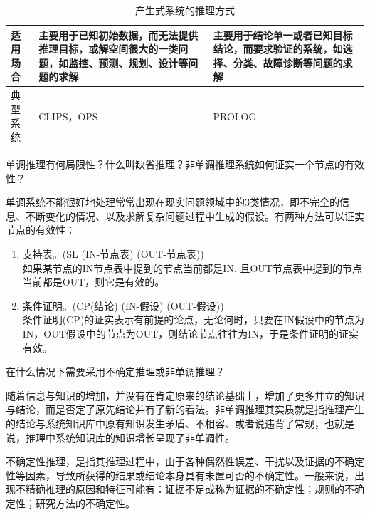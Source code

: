 \begin{solution}
\begin{table}[htbp]
\begin{tabular}{p{80pt}p{110pt}p{110pt}}
		\midrule
		适用场合 & 主要用于已知初始数据，而无法提供推理目标，或解空间很大的一类问题，如监控、预测、规划、设计等问题的求解 & 主要用于结论单一或者已知目标结论，而要求验证的系统，如选择、分类、故障诊断等问题的求解 \\ 
		\midrule
		典型系统 & CLIPS，OPS & PROLOG \\
		\bottomrule
	\end{tabular}
	\caption{产生式系统的推理方式}\label{tab:reasoning-of-production-system}
	\end{table}
\end{solution}

\begin{question}
单调推理有何局限性？什么叫缺省推理？非单调推理系统如何证实一个节点的有效性？
\end{question}
\begin{solution}
单调系统不能很好地处理常常出现在现实问题领域中的3类情况，即不完全的信息、不断变化的情况、以及求解复杂问题过程中生成的假设。有两种方法可以证实节点的有效性：
	\begin{enumerate}
		\item 支持表。(SL (IN-节点表) (OUT-节点表)) \\
			如果某节点的IN节点表中提到的节点当前都是IN, 且OUT节点表中提到的节点当前都是OUT，则它是有效的。
		\item 条件证明。(CP(结论) (IN-假设) (OUT-假设)) \\
			条件证明(CP)的证实表示有前提的论点，无论何时，只要在IN假设中的节点为IN，OUT假设中的节点为OUT，则结论节点往往为IN，于是条件证明的证实有效。 
	\end{enumerate}
\end{solution}

\begin{question}
在什么情况下需要采用不确定推理或非单调推理？
\end{question}
\begin{solution}
随着信息与知识的增加，并没有在肯定原来的结论基础上，增加了更多并立的知识与结论，而是否定了原先结论并有了新的看法。非单调推理其实质就是指推理产生的结论与系统知识库中原有知识发生矛盾、不相容、或者说违背了常规，也就是说，推理中系统知识库的知识增长呈现了非单调性。\par
不确定性推理，是指其推理过程中，由于各种偶然性误差、干扰以及证据的不确定性等因素，导致所获得的结果或结论本身具有未置可否的不确定性。一般来说，出现不精确推理的原因和特征可能有：证据不足或称为证据的不确定性；规则的不确定性；研究方法的不确定性。 
\end{solution}

